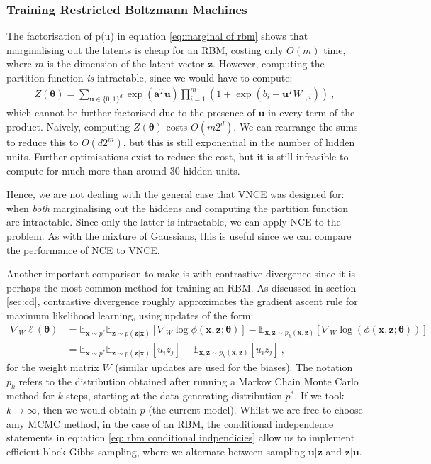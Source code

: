 \documentclass[11pt, oneside]{article}
\newcommand{\thetab}{{\boldsymbol{\theta}}}
\newcommand{\pnn}{\phi}
\renewcommand{\u}{{\mathbf u}}
\newcommand{\x}{{\mathbf x}}
\newcommand{\z}{{\mathbf z}}
\newcommand{\E}{\mathbb{E}}
\newcommand{\Edata}{\E_{\x \sim p^*}}
\theoremstyle{definition}
\begin{document}
\subsubsection{Training Restricted Boltzmann Machines}
\label{sec:training_rbms}

The factorisation of p(\u) in equation \ref{eq:marginal of rbm} shows that marginalising out the latents is cheap for an RBM, costing only $O(m)$ time, where $m$ is the dimension of the latent vector $\z$. However, computing the partition function \emph{is} intractable, since we would have to compute:
\begin{align}
    Z(\thetab) = \sum_{\u \in \{0, 1\}^d} \exp(\textbf{a}^T\u) \prod_{i=1}^m (1 + \exp(b_i + \u^T W_{:, i})) \ ,
\end{align}
which cannot be further factorised due to the presence of $\u$ in every term of the product. Naively, computing $Z(\thetab)$ costs $O(m2^d)$. We can rearrange the sums to reduce this to $O(d2^m)$, but this is still exponential in the number of hidden units. Further optimisations exist to reduce the cost, but it is still infeasible to compute for much more than around 30 hidden units. 

Hence, we are not dealing with the general case that VNCE was designed for: when \emph{both} marginalising out the hiddens and computing the partition function are intractable. Since only the latter is intractable, we can apply NCE to the problem. As with the mixture of Gaussians, this is useful since we can compare the performance of NCE to VNCE.

Another important comparison to make is with contrastive divergence since it is perhaps the most common method for training an RBM. As discussed in section \ref{sec:cd}, contrastive divergence roughly approximates the gradient ascent rule for maximum likelihood learning, using updates of the form:
\begin{align}
    \label{eq:cd grad update for rbm}
    \nabla_{W} \ell(\thetab) &= \Edata \E_{\z \sim p(\z | \x)} \left[ \nabla_{W} \log \pnn(\x, \z;\thetab) \right] - \E_{\x, \z \sim p_k(\x, \z)} \left[\nabla_{W} \log \left(\pnn(\x, \z;\thetab) \right) \right] \\
                      &= \Edata \E_{\z \sim p(\z | \x)} \left[ u_i z_j \right] - \E_{\x, \z \sim p_k(\x, \z)} \left[ u_i z_j \right] \ ,
\end{align}
for the weight matrix $W$ (similar updates are used for the biases). The notation $p_k$ refers to the distribution obtained after running a Markov Chain Monte Carlo method for $k$ steps, starting at the data generating distribution $p^*$. If we took $k \rightarrow \infty$, then we would obtain $p$ (the current model). Whilst we are free to choose amy MCMC method, in the case of an RBM, the conditional independence statements in equation \ref{eq: rbm conditional indpendicies} allow us to implement efficient block-Gibbs sampling, where we alternate between sampling $\u | \z$ and $\z | \u$.
\end{document}
